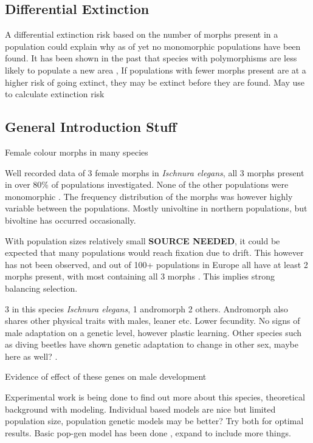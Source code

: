 \documentclass{article}
\begin{document}
\subsection{Differential Extinction}
A differential extinction risk based on the number of morphs present in a population could explain why as of yet no monomorphic populations have been found. It has been shown in the past that species with polymorphisms are less likely to populate a new area \cite{bessa2003},
If populations with fewer morphs present are at a higher risk of going extinct, they may be extinct before they are found. May use \cite{Ovaskainen2010} to calculate extinction risk


\subsection{General Introduction Stuff}

Female colour morphs in many species

Well recorded data of 3 female morphs in \textit{Ischnura elegans}, all 3 morphs present in over 80\% of populations investigated. None of the other populations were monomorphic \cite{Gosden2011}. The frequency distribution of the morphs was however highly variable between the populations.
Mostly univoltine in northern populations\cite{Svensson2007}, but bivoltine has occurred occasionally.

With population sizes relatively small \textbf{SOURCE NEEDED}, it could be expected that many populations would reach fixation due to drift. This however has not been observed, and out of 100+ populations in Europe all have at least 2 morphs present, with most containing all 3 morphs \cite{Gosden2011}. This implies strong balancing selection.

3 in this species \textit{Ischnura elegans}, 1 andromorph 2 others. Andromorph also shares other physical traits with males, leaner etc. Lower fecundity.
No signs of male adaptation on a genetic level, however plastic learning. Other species such as diving beetles have shown genetic adaptation to change in other sex, maybe here as well? \cite{Karlsson2013}.

Evidence of effect of these genes on male development \cite{Abbott2005, Abbott2007}


Experimental work is being done to find out more about this species, theoretical background with modeling. Individual based models are nice but limited population size, population genetic models may be better? Try both for optimal results. Basic pop-gen model has been done \cite{LeRouzic2015}, expand to include more things.
\end{document}
